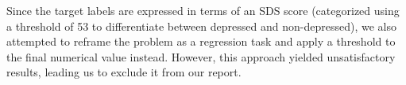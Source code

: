 Since the target labels are expressed in terms of an SDS score (categorized using a threshold of 53 to differentiate between depressed and non-depressed), we also attempted to reframe the problem as a regression task and apply a threshold to the final numerical value instead. However, this approach yielded unsatisfactory results, leading us to exclude it from our report.
